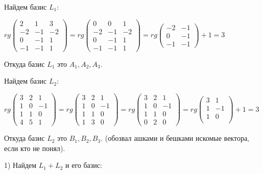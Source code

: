 \documentclass{article}
\begin{document}
Найдем базис $L_1$:

$rg \begin{pmatrix}
    2 &1 &3 \\
    -2 & -1 & -2 \\
    0 & -1 & 1 \\
    -1 & -1 & 1
\end{pmatrix} = rg \begin{pmatrix}
    0 &0 &1 \\
    -2 & -1 & -2 \\
    0 & -1 & 1 \\
    -1 & -1 & 1
\end{pmatrix} = rg \begin{pmatrix}
    -2 & -1  \\
    0 & -1  \\
    -1 & -1 
\end{pmatrix} + 1 = 3$

Откуда базис $L_1$ это $A_1, A_2, A_3$. 

Найдем базис $L_2$:

$rg \begin{pmatrix}
    3 &2 &1 \\
    1 & 0 & -1 \\
    1 & 1 & 0 \\
    4 & 5 & 1
\end{pmatrix} =rg \begin{pmatrix}
    3 &2 &1 \\
    1 & 0 & -1 \\
    1 & 1 & 0 \\
    1 & 3 & 0
\end{pmatrix} =rg \begin{pmatrix}
    3 &2 &1 \\
    1 & 0 & -1 \\
    1 & 1 & 0 \\
    0 & 2 & 0
\end{pmatrix} = rg \begin{pmatrix}
    3  &1 \\
    1  & -1 \\
    1 & 0 \\
\end{pmatrix} +1 = 3 $

Откуда базис $L_2$ это $B_1, B_2, B_3$. (обозвал ашками и бешками искомые вектора, если кто не понял).

1) {Найдем $L_1+L_2$ и его базис:}
\end{document}
